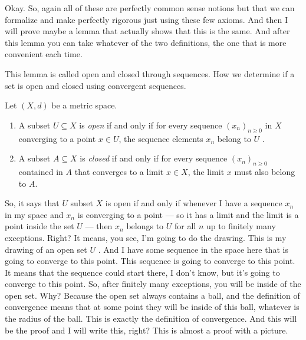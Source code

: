 \begin{spoken-clean}[00:07:23 - 00:08:51]
Okay. So, again all of these are perfectly common sense notions but that we can formalize and make perfectly rigorous just using these few axioms. And then I will prove maybe a lemma that actually shows that this is the same. And after this lemma you can take whatever of the two definitions, the one that is more convenient each time.

This lemma is called open and closed through sequences. How we determine if a set is open and closed using convergent sequences.
\end{spoken-clean}

\begin{nice-box}
\setcounter{theorem}{48}
\begin{lemma}\label{lem:topo-sequences}
Let $(X, d)$ be a metric space.
\begin{enumerate}
    \setcounter{enumi}{0} \item A subset $U \subseteq X$ is \emph{open} if and only if for every sequence $(x_n)_{n \ge 0}$ in $X$ converging to a point $x \in U$, the sequence elements $x_n$ belong to $U$ .
    \setcounter{enumi}{1} \item A subset $A \subseteq X$ is \emph{closed} if and only if for every sequence $(x_n)_{n \ge 0}$ contained in $A$ that converges to a limit $x \in X$, the limit $x$ must also belong to $A$.
\end{enumerate}
\end{lemma}
\end{nice-box}

\begin{spoken-clean}[00:08:51 - 00:11:14]
So, it says that $U$ subset $X$ is open if and only if whenever I have a sequence $x_n$ in my space and $x_n$ is converging to a point --- so it has a limit and the limit is a point inside the set $U$ --- then $x_n$ belongs to $U$ for all $n$ up to finitely many exceptions. Right? It means, you see, I'm going to do the drawing. This is my drawing of an open set $U$ . And I have some sequence in the space here that is going to converge to this point. This sequence is going to converge to this point. It means that the sequence could start there, I don't know, but it's going to converge to this point. So, after finitely many exceptions, you will be inside of the open set. Why? Because the open set always contains a ball, and the definition of convergence means that at some point they will be inside of this ball, whatever is the radius of the ball. This is exactly the definition of convergence. And this will be the proof and I will write this, right? This is almost a proof with a picture.
\end{spoken-clean}

